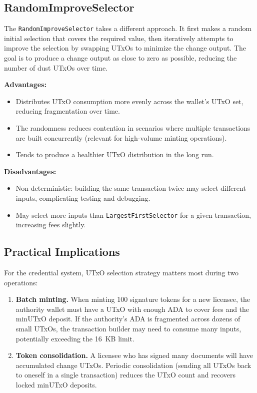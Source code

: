 \subsection{RandomImproveSelector}

The \texttt{RandomImproveSelector} takes a different approach. It first
makes a random initial selection that covers the required value, then
iteratively attempts to improve the selection by swapping UTxOs to
minimize the change output. The goal is to produce a change output as
close to zero as possible, reducing the number of dust UTxOs over time.

\textbf{Advantages:}
\begin{itemize}[nosep]
  \item Distributes UTxO consumption more evenly across the wallet's
    UTxO set, reducing fragmentation over time.
  \item The randomness reduces contention in scenarios where multiple
    transactions are built concurrently (relevant for high-volume
    minting operations).
  \item Tends to produce a healthier UTxO distribution in the long run.
\end{itemize}

\textbf{Disadvantages:}
\begin{itemize}[nosep]
  \item Non-deterministic: building the same transaction twice may
    select different inputs, complicating testing and debugging.
  \item May select more inputs than \texttt{LargestFirstSelector} for a
    given transaction, increasing fees slightly.
\end{itemize}

\subsection{Practical Implications}

For the credential system, UTxO selection strategy matters most during
two operations:

\begin{enumerate}[nosep]
  \item \textbf{Batch minting.} When minting 100 signature tokens for a
    new licensee, the authority wallet must have a UTxO with enough ADA
    to cover fees and the minUTxO deposit. If the authority's ADA is
    fragmented across dozens of small UTxOs, the transaction builder may
    need to consume many inputs, potentially exceeding the 16~KB limit.
  \item \textbf{Token consolidation.} A licensee who has signed many
    documents will have accumulated change UTxOs. Periodic consolidation
    (sending all UTxOs back to oneself in a single transaction) reduces
    the UTxO count and recovers locked minUTxO deposits.
\end{enumerate}

